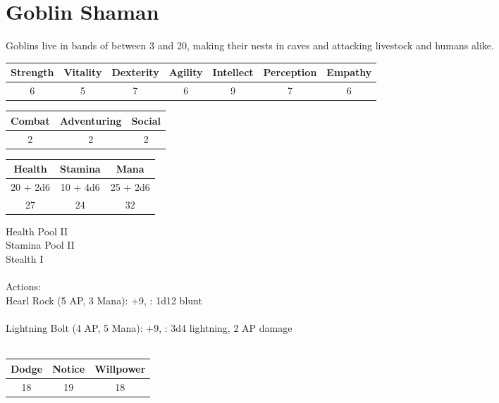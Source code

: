 \section{Goblin Shaman}

Goblins live in bands of between 3 and 20, making their nests in caves and attacking livestock and humans alike.

\begin{minipage}[H]{1\textwidth}
	\centering
	\begin{tabular}[c]{|c | c | c | c | c | c | c|}
		\hline
		Strength & Vitality & Dexterity & Agility & Intellect & Perception & Empathy\\
		\hline
		6 & 5 & 7 & 6 & 9 & 7 & 6\\
		\hline
	\end{tabular}
\end{minipage}
\bigbreak
\begin{minipage}[H]{1\textwidth}
	\centering
	\begin{tabular}[c]{|c | c | c|}
		\hline
		Combat & Adventuring & Social\\
		\hline
		2 & 2 & 2\\
		\hline
	\end{tabular}
\end{minipage}
\bigbreak
\begin{minipage}[H]{1\textwidth}
	\centering
	\begin{tabular}[c]{|c | c | c|}
		\hline
		Health & Stamina & Mana\\
		\hline
		20 + 2d6 & 10 + 4d6 & 25 + 2d6\\
		27 & 24 & 32\\
		\hline
	\end{tabular}
\end{minipage}
\noindent
Health Pool II\\
Stamina Pool II\\
Stealth I\\
\\
Actions:\\
Hearl Rock (5 AP, 3 Mana): +9, : 1d12 blunt\\
\\
Lightning Bolt (4 AP, 5 Mana): +9, : 3d4 lightning, 2 AP damage\\
\\
\begin{minipage}[H]{1\textwidth}
	\centering
	\begin{tabular}[c]{|c | c | c|}
		\hline
		Dodge & Notice & Willpower\\
		\hline
		18 & 19 & 18\\
		\hline
	\end{tabular}
\end{minipage}
